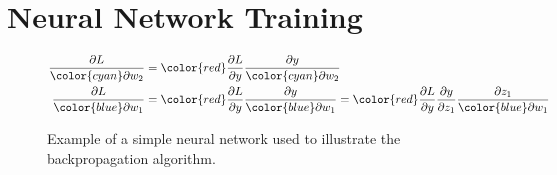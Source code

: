 \section{Neural Network Training}
\label{sec:nn-training}
\begin{figure}[t]
    \vspace{2em}
    \begin{align*}
        \frac{\partial L}{{\color{cyan}\partial  w_2}} &=  {\color{red}\frac{\partial L}{\partial y}} \frac{\partial y}{{\color{cyan}\partial w_2}} \\
        \frac{\partial L}{{\color{blue} \partial w_1}} &=   {\color{red}\frac{\partial L}{\partial y}} \frac{\partial y}{{\color{blue}\partial w_1}} = {\color{red}\frac{\partial L}{\partial y}} \frac{\partial y}{\partial z_1} \frac{\partial z_1}{{\color{blue}\partial w_1}}
    \end{align*}
    \caption{Example of a simple neural network used to illustrate the backpropagation algorithm.}
    \label{fig:simple-nn}
\end{figure}


